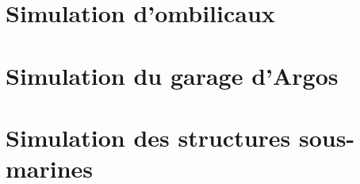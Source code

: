 		\section{Simulation d'ombilicaux}

			

		\section{Simulation du garage d'Argos}

		\section{Simulation des structures sous-marines}
		